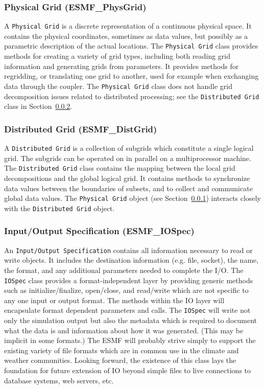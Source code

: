 \subsubsection{Physical Grid (ESMF\_PhysGrid)}
\label{sec:physgrid} 
A {\tt Physical Grid} is a discrete representation of a continuous physical space.  It contains the physical coordinates, sometimes as data values, but possibly
as a parametric description of the actual locations.  
The {\tt Physical Grid} class provides methods for creating a variety of grid 
types, including both reading grid information
and generating grids from parameters.  It provides methods for regridding, or translating
one grid to another, used for example when exchanging data through the coupler.
The {\tt Physical Grid} class does not handle grid decomposition issues related to 
distributed processing; see the {\tt Distributed Grid} class in 
Section~\ref{sec:distgrid}.

\subsubsection{Distributed Grid (ESMF\_DistGrid)} 
\label{sec:distgrid} 
A {\tt Distributed Grid} is a collection of subgrids which
constitute a single logical grid.  The subgrids can be operated on in
parallel on a multiprocessor machine.  The {\tt Distributed Grid} class contains the mapping
between the local grid decompositions and the global logical grid. 
It contains methods to 
synchronize data values between the boundaries of subsets, and to
collect and communicate global data values.  The
{\tt Physical Grid} object (see Section~\ref{sec:physgrid}) interacts closely 
with the {\tt Distributed Grid} object.

\subsubsection{Input/Output Specification (ESMF\_IOSpec)}
\label{sec:iospec} 
An {\tt Input/Output Specification} contains all 
information necessary to read or write objects.  It includes the 
destination information (e.g. file, socket), the name,
the format, and any additional parameters needed to complete the I/O.
The {\tt IOSpec} class provides a format-independent layer by
providing generic methods such as initialize/finalize, open/close, 
and read/write which are not specific to any one input or output format.
The methods
within the IO layer will encapsulate format dependent parameters and calls.
The {\tt IOSpec} will write not only the simulation output 
but also the metadata which is required to document what the data is
and information about how it was generated.  (This may be implicit in
some formats.)
The ESMF will probably strive simply to
support the existing variety of file formats which are in common use in
the climate and weather communities.  Looking forward,
the existence of this class lays the foundation for future extension 
of IO beyond simple files to live connections to database systems, 
web servers, etc.





